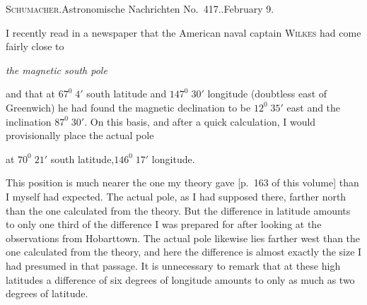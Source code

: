 \begin{center}\small\textsc{Schumacher}.\quad Astronomische Nachrichten No.\ 417..\quad February 9.\end{center}

I recently read in a newspaper that the American naval captain \textsc{Wilkes} had come fairly close to
\begin{center}\textit{the magnetic south pole}\end{center}
and that at $67^0\;4'$ south latitude and $147^0\;30'$ longitude (doubtless east of Greenwich) he had found the magnetic declination to be $12^0\;35'$ east and the inclination $87^0\;30'$. On this basis, and after a quick calculation, I would provisionally place the actual pole
\begin{center}at $70^0\;21'$ south latitude,\qquad $146^0\;17'$ longitude.\end{center}
This position is much nearer the one my theory gave [p.\ 163 of this volume] than I myself had expected. The actual pole, as I had supposed there, farther north than the one calculated from the theory. But the difference in latitude amounts to only one third of the difference I was prepared for after looking at the observations from Hobarttown. The actual pole likewise lies farther west than the one calculated from the theory, and here the difference is almost exactly the size I had presumed in that passage. It is unnecessary to remark that at these high latitudes a difference of six degrees of longitude amounts to only as much as two degrees of latitude.

